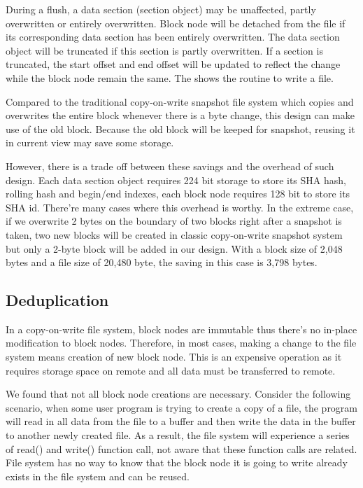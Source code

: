     During a flush, a data section (section object) may be unaffected, partly overwritten or entirely overwritten. Block node will be detached from the file if its corresponding data section has been entirely overwritten. The data section object will be truncated if this section is partly overwritten. If a section is truncated, the start offset and end offset will be updated to reflect the change while the block node remain the same. The  shows the routine to write a file.

    Compared to the traditional copy-on-write snapshot file system which copies and overwrites the entire block whenever there is a byte change, this design can make use of the old block. Because the old block will be keeped for snapshot, reusing it in current view may save some storage.

    However, there is a trade off between these savings and the overhead of such design. Each data section object requires 224 bit storage to store its SHA hash, rolling hash and begin/end indexes, each block node requires 128 bit to store its SHA id. There're many cases where this overhead is worthy. In the extreme case, if we overwrite 2 bytes on the boundary of two blocks right after a snapshot is taken, two new blocks will be created in classic copy-on-write snapshot system but only a 2-byte block will be added in our design. With a block size of 2,048 bytes and a file size of 20,480 byte, the saving in this case is 3,798 bytes.

\subsection{Deduplication}

    In a copy-on-write file system, block nodes are immutable thus there's no in-place modification to block nodes. Therefore, in most cases,  making a change to the file system means creation of new block node. This is an expensive operation as it requires storage space on remote and all data must be transferred to remote.
    
    We found that not all block node creations are necessary. Consider the following scenario, when some user program is trying to create a copy of a file, the program will read in all data from the file to a buffer and then write the data in the buffer to another newly created file. As a result, the file system will experience a series of read() and write() function call, not aware that these function calls are related. File system has no way to know that the block node it is going to write already exists in the file system and can be reused.

